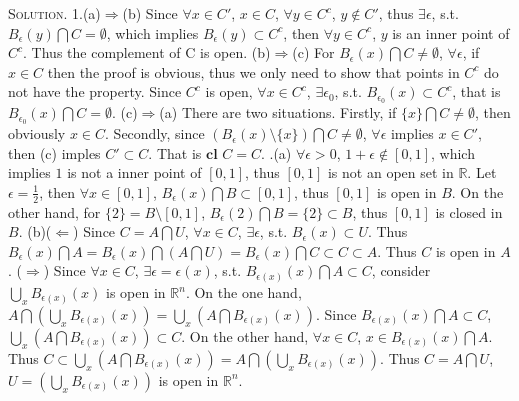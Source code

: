 \documentclass[12pt, a4paper, oneside]{ctexart}
\newenvironment{solution}{\par\noindent\textsc{Solution. }}{\\\par}
\begin{document}
\begin{solution}
	1.(a)$\Rightarrow$(b) Since $\forall x \in C'$, $x \in C$, $\forall y \in C^{c}$, $y \notin C'$, thus $\exists \epsilon$, s.t. $B_{\epsilon}(y) \bigcap C = \emptyset$, which implies $B_{\epsilon}(y) \subset C^{c}$, then $\forall y \in C^{c}$, $y$ is an inner point of $C^{c}$. Thus the complement of C is open. \newline
	(b)$\Rightarrow$(c) For $B_{\epsilon}(x) \bigcap C \neq \emptyset$, $\forall \epsilon$, if $x \in C$ then the proof is obvious, thus we only need to show that points in $C^{c}$ do not have the property. Since $C^{c}$ is open, $\forall x \in C^{c}$, $\exists \epsilon_{0}$, s.t. $B_{\epsilon_{0}}(x) \subset C^{c}$, that is $B_{\epsilon_{0}}(x) \bigcap C = \emptyset$. \newline
	(c)$\Rightarrow$(a) There are two situations. Firstly, if $\{x\} \bigcap C \neq \emptyset$, then obviously $x \in C$. Secondly, since $(B_{\epsilon}(x) \setminus \{x\}) \bigcap C \neq \emptyset$, $\forall \epsilon$ implies $x \in C'$, then (c) imples $C' \subset C$. That is $\mathbf{cl}$ $C = C$. .(a) $\forall \epsilon > 0$, $1 + \epsilon \notin [0,1]$, which implies $1$ is not a inner point of $[0,1]$, thus $[0,1]$ is not an open set in $\mathbb{R}$. Let $\epsilon = \frac{1}{2}$, then $\forall x \in [0,1]$, $B_{\epsilon}(x) \bigcap B \subset [0,1]$, thus $[0,1]$ is open in $B$. On the other hand, for $\{2\} = B \setminus [0,1]$, $B_{\epsilon}(2) \bigcap B = \{2\} \subset B$, thus $[0,1]$ is closed in $B$. \newline
	(b)($\Leftarrow$) Since $C = A \bigcap U$, $\forall x \in C$, $\exists \epsilon$, s.t. $B_{\epsilon}(x) \subset U$. Thus $B_{\epsilon}(x) \bigcap A = B_{\epsilon}(x) \bigcap (A \bigcap U) = B_{\epsilon}(x) \bigcap C \subset C \subset A$. Thus $C$ is open in $A$. \newline
	($\Rightarrow$) Since $\forall x \in C$, $\exists \epsilon = \epsilon(x)$, s.t. $B_{\epsilon(x)}(x) \bigcap A \subset C$, consider $\bigcup\limits_{x}B_{\epsilon(x)}(x)$ is open in $\mathbb{R}^{n}$. On the one hand, $A \bigcap (\bigcup\limits_{x}B_{\epsilon(x)}(x)) = \bigcup\limits_{x} (A \bigcap B_{\epsilon(x)}(x))$. Since $B_{\epsilon(x)}(x) \bigcap A \subset C$, $\bigcup\limits_{x} (A \bigcap B_{\epsilon(x)}(x)) \subset C$. On the other hand, $\forall x \in C$, $x \in B_{\epsilon(x)}(x) \bigcap A$. Thus $C \subset \bigcup\limits_{x} (A \bigcap B_{\epsilon(x)}(x)) = A \bigcap (\bigcup\limits_{x}B_{\epsilon(x)}(x))$. Thus $C = A \bigcap U$, $U =  (\bigcup\limits_{x}B_{\epsilon(x)}(x))$ is open in $\mathbb{R}^{n}$.
\end{solution}
\end{document}
